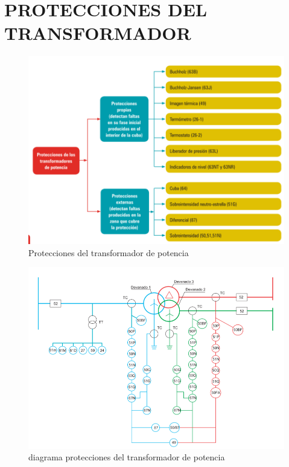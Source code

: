 \documentclass[a5paper]{book}%
\begin{document}
    \section{PROTECCIONES DEL TRANSFORMADOR}

    \begin{figure}[H]
      \centering  
      \caption{Protecciones del transformador de potencia}
      \label{fig:proteccionestrafo}
      \includegraphics[width=\linewidth]{proteccion_trafo}
    \end{figure}

        \begin{figure}[H]
      \centering  
      \caption{diagrama protecciones del  transformador de potencia}
      \label{fig:diagramatrafo}
      \includegraphics[width=\linewidth]{diagramapttrafo}
    \end{figure}
\end{document}
